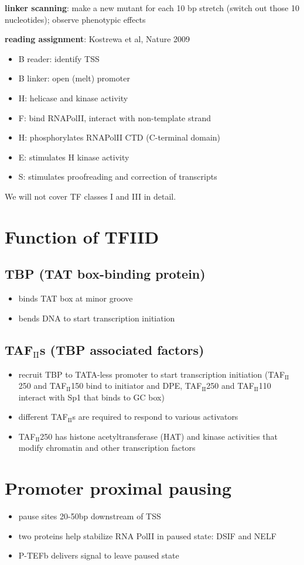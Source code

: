 \documentclass[10pt]{article}
\newenvironment{mitemize}
{
  \begin{itemize}
  \setlength{\itemsep}{1pt}
  \setlength{\parskip}{0pt}
  \setlength{\parsep}{0pt}}{\end{itemize}
}
\newcommand{\textsub}[1]{\ensuremath{_{\textrm{#1}}}}
\begin{document}
\textbf{linker scanning}: make a new mutant for each 10 bp stretch (switch out those 10 nucleotides); observe phenotypic effects

\textbf{reading assignment}: Kostrewa et al, Nature 2009
\begin{mitemize}
  \item B reader: identify TSS
  \item B linker: open (melt) promoter
  \item H: helicase and kinase activity
  \item F: bind RNAPolII, interact with non-template strand
  \item H: phosphorylates RNAPolII CTD (C-terminal domain)
  \item E: stimulates H kinase activity
  \item S: stimulates proofreading and correction of transcripts
\end{mitemize}

We will not cover TF classes I and III in detail.

\section*{Function of TFIID}

\subsection*{TBP (TAT box-binding protein)}
\begin{mitemize}
  \item binds TAT box at minor groove
  \item bends DNA to start transcription initiation
\end{mitemize}

\subsection*{TAF\textsub{II}s (TBP associated factors)}
\begin{mitemize}
  \item recruit TBP to TATA-less promoter to start transcription initiation (TAF\textsub{II}250 and TAF\textsub{II}150 bind to initiator and DPE, TAF\textsub{II}250 and TAF\textsub{II}110 interact with Sp1 that binds to GC box)
  \item different TAF\textsub{II}s are required to respond to various activators
  \item TAF\textsub{II}250 has histone acetyltransferase (HAT) and kinase activities that modify chromatin and other transcription factors
\end{mitemize}

\section*{Promoter proximal pausing}
\begin{mitemize}
  \item pause sites 20-50bp downstream of TSS
  \item two proteins help stabilize RNA PolII in paused state: DSIF and NELF
  \item P-TEFb delivers signal to leave paused state
\end{mitemize}
\end{document}
